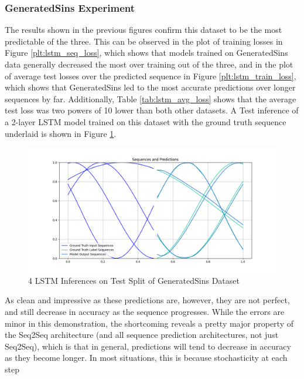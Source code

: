 \documentclass{scrartcl}
\begin{document}
\subsubsection{GeneratedSins Experiment}
\label{subsubsec:generated_sins}

The results shown in the previous figures confirm this dataset to be the most
predictable of the three. This can be observed in the plot of training losses
in Figure \ref{plt:lstm_seq_loss}, which shows that models trained on
GeneratedSins data generally decreased the most over training out of the three,
and in the plot of average test losses over the predicted sequence in Figure
\ref{plt:lstm_train_loss}, which shows that GeneratedSins led to the most
accurate predictions over longer sequences by far. Additionally, Table
\ref{tab:lstm_avg_loss} shows that the average test loss was two powers of 10
lower than both other datasets. A Test inference of a 2-layer LSTM model
trained on this dataset with the ground truth sequence underlaid is shown in
Figure \ref{inf:lstm_sins_inference}. 

\begin{figure}[H]
	\centering
	\includegraphics[width=1\textwidth]{inferences/sins/3layer_s11.png}
	\caption{4 LSTM Inferences on Test Split of GeneratedSins Dataset}
	\label{inf:lstm_sins_inference}
\end{figure}

As clean and impressive as these predictions are, however, they are not
perfect, and still decrease in accuracy as the sequence progresses. While the
errors are minor in this demonstration, the shortcoming reveals a pretty major
property of the Seq2Seq architecture (and all sequence prediction
architectures, not just Seq2Seq), which is that in general, predictions will
tend to decrease in accuracy as they become longer. In most situations, this is
because stochasticity at each step 
\end{document}
